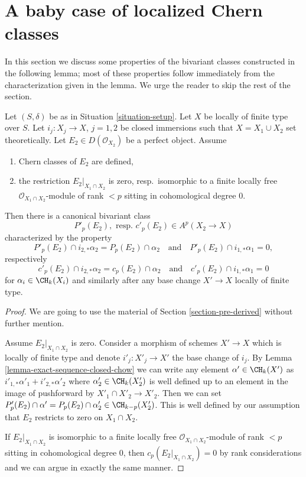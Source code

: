 \section{A baby case of localized Chern classes}
\label{section-preparation-localized-chern}

\noindent
In this section we discuss some properties of the bivariant classes
constructed in the following lemma; most of these properties follow
immediately from the characterization given in the lemma. We urge the
reader to skip the rest of the section.

\begin{lemma}
\label{lemma-silly}
Let $(S, \delta)$ be as in Situation \ref{situation-setup}. Let $X$ be
locally of finite type over $S$. Let $i_j : X_j \to X$, $j = 1, 2$
be closed immersions such that $X = X_1 \cup X_2$ set theoretically. Let
$E_2 \in D(\mathcal{O}_{X_2})$ be a perfect object. Assume
\begin{enumerate}
\item Chern classes of $E_2$ are defined,
\item the restriction $E_2|_{X_1 \cap X_2}$ is zero,
resp.\ isomorphic to a finite locally free $\mathcal{O}_{X_1 \cap X_2}$-module
of rank $< p$ sitting in cohomological degree $0$.
\end{enumerate}
Then there is a canonical bivariant class
$$
P'_p(E_2),\text{ resp. }c'_p(E_2) \in A^p(X_2 \to X)
$$
characterized by the property
$$
P'_p(E_2) \cap i_{2, *} \alpha_2 = P_p(E_2) \cap \alpha_2
\quad\text{and}\quad
P'_p(E_2) \cap i_{1, *} \alpha_1 = 0,
$$
respectively
$$
c'_p(E_2) \cap i_{2, *} \alpha_2 = c_p(E_2) \cap \alpha_2
\quad\text{and}\quad
c'_p(E_2) \cap i_{1, *} \alpha_1 = 0
$$
for $\alpha_i \in \CH_k(X_i)$ and similarly after any base change
$X' \to X$ locally of finite type.
\end{lemma}

\begin{proof}
We are going to use the material of Section \ref{section-pre-derived}
without further mention.

\medskip\noindent
Assume $E_2|_{X_1 \cap X_2}$ is zero.
Consider a morphism of schemes $X' \to X$
which is locally of finite type and denote $i'_j : X'_j \to X'$ the
base change of $i_j$. By Lemma \ref{lemma-exact-sequence-closed-chow}
we can write any element $\alpha' \in \CH_k(X')$ as
$i'_{1, *}\alpha'_1 + i'_{2, *}\alpha'_2$ where
$\alpha'_2 \in \CH_k(X'_2)$
is well defined up to an element in the image of pushforward
by $X'_1 \cap X'_2 \to X'_2$. Then we can set
$P'_p(E_2) \cap \alpha' = P_p(E_2) \cap \alpha'_2 \in \CH_{k - p}(X'_2)$. This
is well defined by our assumption that $E_2$ restricts
to zero on $X_1 \cap X_2$.

\medskip\noindent
If $E_2|_{X_1 \cap X_2}$ is isomorphic to a finite locally free
$\mathcal{O}_{X_1 \cap X_2}$-module of rank $< p$ sitting in
cohomological degree $0$, then $c_p(E_2|_{X_1 \cap X_2}) = 0$
by rank considerations and we can argue in exactly the same manner.
\end{proof}

